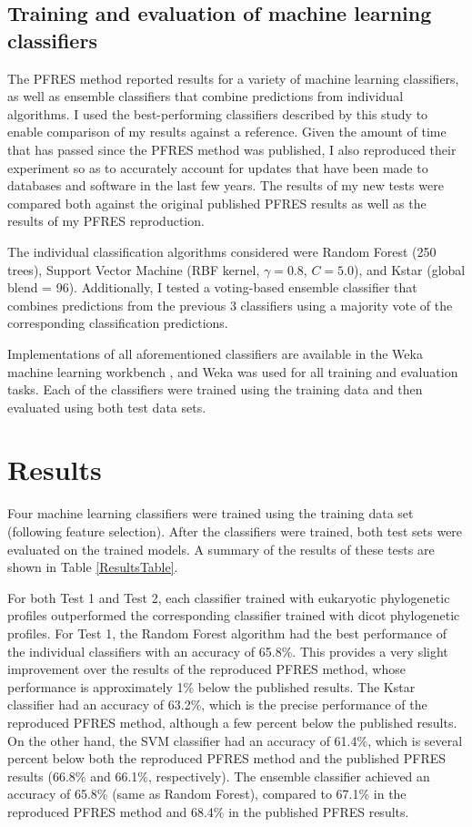 \documentclass{bioinfo}
\begin{document}
\subsection*{Training and evaluation of machine learning classifiers}
The PFRES method reported results for a variety of machine learning classifiers, as well as ensemble classifiers that combine predictions from individual algorithms.
I used the best-performing classifiers described by this study to enable comparison of my results against a reference.
Given the amount of time that has passed since the PFRES method was published, I also reproduced their experiment so as to accurately account for updates that have been made to databases and software in the last few years.
The results of my new tests were compared both against the original published PFRES results as well as the results of my PFRES reproduction.

The individual classification algorithms considered were Random Forest (250 trees), Support Vector Machine (RBF kernel, $\gamma = 0.8$, $C = 5.0$), and Kstar (global blend = 96).
Additionally, I tested a voting-based ensemble classifier that combines predictions from the previous 3 classifiers using a majority vote of the corresponding classification predictions.

Implementations of all aforementioned classifiers are available in the Weka machine learning workbench \citep{Eibe}, and Weka was used for all training and evaluation tasks.
Each of the classifiers were trained using the training data and then evaluated using both test data sets.



\section*{Results}
Four machine learning classifiers were trained using the training data set (following feature selection).
After the classifiers were trained, both test sets were evaluated on the trained models.
A summary of the results of these tests are shown in Table \ref{ResultsTable}.

For both Test 1 and Test 2, each classifier trained with eukaryotic phylogenetic profiles outperformed the corresponding classifier trained with dicot phylogenetic profiles.
For Test 1, the Random Forest algorithm had the best performance of the individual classifiers with an accuracy of 65.8\%.
This provides a very slight improvement over the results of the reproduced PFRES method, whose performance is approximately 1\% below the published results.
The Kstar classifier had an accuracy of 63.2\%, which is the precise performance of the reproduced PFRES method, although a few percent below the published results.
On the other hand, the SVM classifier had an accuracy of 61.4\%, which is several percent below both the reproduced PFRES method and the published PFRES results (66.8\% and 66.1\%, respectively).
The ensemble classifier achieved an accuracy of 65.8\% (same as Random Forest), compared to 67.1\% in the reproduced PFRES method and 68.4\% in the published PFRES results.
\end{document}
